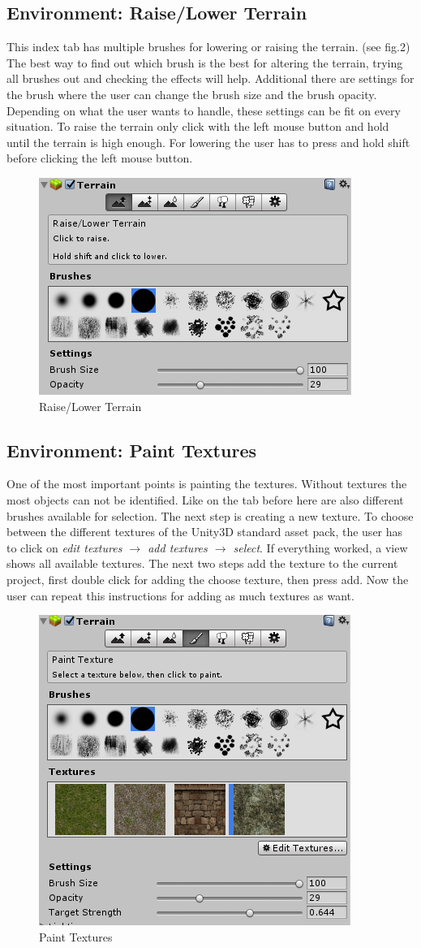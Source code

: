 \documentclass[conference]{IEEEtran}
\begin{document}
\subsection{Environment: Raise/Lower Terrain}
This index tab has multiple brushes for lowering or raising the terrain. (see fig.2) The best way to find out which brush is the
best for altering the terrain, trying all brushes out and checking the effects will help. Additional there are settings for the brush where the user can change the brush size and the brush opacity. Depending on what the user wants to handle, these settings can be fit on every situation. To raise the terrain only click with the left mouse button and hold until the terrain is high enough. For lowering the user has to press and hold shift before clicking the left mouse button.
 
\begin{figure}[htbp]
  \includegraphics[width=.4\textwidth]{pictures/raise_lower_terrain}
  \caption{Raise/Lower Terrain}
  \label{fig:raise_lower_terrain}
\end{figure}

\subsection{Environment: Paint Textures}
One of the most important points is painting the textures. Without textures the most objects can not be identified. 
Like on the tab before here are also different brushes available for selection. The next step is creating a new texture. 
To choose between the different textures of the Unity3D standard asset pack, the user has to click on \emph{edit textures $\rightarrow$ add textures $\rightarrow$ select}. If everything worked, a view shows all available textures. The next two steps add the texture to the current project, first double click for adding the choose texture, then press add. Now the user can repeat this instructions for adding as much textures as want.

\begin{figure}[htbp]
  \includegraphics[width=.4\textwidth]{pictures/paint_textures}
  \caption{Paint Textures}
  \label{fig:paint_textures}
\end{figure}
\end{document}
